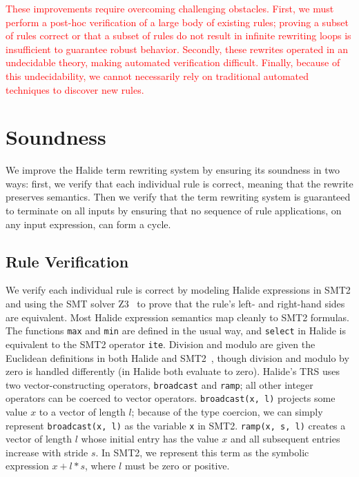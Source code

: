 \documentclass[acmsmall,review]{acmart}\settopmatter{printfolios=true,printccs=false,printacmref=false}
\newcommand{\sak}[1]{\textcolor{olive}{\textit{[{#1} --SK]}}}
\newcommand{\modified}[1]{\textcolor{red}{{#1}}}
\begin{document}
\modified{These improvements require overcoming challenging obstacles.  First,
  we must perform a post-hoc verification of a large body of existing rules;
  proving a subset of rules correct or that a subset of rules do not result in infinite
  rewriting loops is insufficient to guarantee robust behavior.  Secondly,
  these rewrites operated in an undecidable theory, making automated verification
  difficult.  Finally, because of this undecidability, we cannot necessarily
  rely on traditional automated techniques to discover new rules.}

\section{Soundness}
\label{sec:soundness}

We improve the Halide term rewriting system by ensuring its soundness in
two ways: first, we verify that each individual rule is correct, meaning that the
rewrite preserves semantics. Then we verify that the term rewriting system is
guaranteed to terminate on all inputs by ensuring that no sequence of
rule applications, on any input expression, can form a cycle.

\subsection{Rule Verification}
\label{sec:verification}
We verify each individual rule is correct by modeling Halide
expressions in SMT2 and using the SMT solver Z3~\cite{de2008z3} to
prove that the rule's left- and right-hand sides are equivalent. Most Halide expression
semantics map cleanly to SMT2 formulas. The functions \texttt{max} and
\texttt{min} are defined in the usual way, and \texttt{select} in
Halide is equivalent to the SMT2 operator \texttt{ite}. Division and
modulo are given the Euclidean definitions in both Halide and
SMT2~\cite{boute1992euclidean}, though division and modulo by zero is handled
differently (in Halide both evaluate to zero).
Halide's TRS uses two vector-constructing operators, \texttt{broadcast} and \texttt{ramp}; all
other integer operators can be coerced to vector operators. 
\texttt{broadcast(x, l)} projects some value $x$ to a vector of length $l$; because of
the type coercion, we can simply represent \texttt{broadcast(x, l)} as the variable
\texttt{x} in SMT2. \texttt{ramp(x, s, l)} creates a vector of length $l$
whose initial entry has the value $x$ and all subsequent entries increase with
stride $s$. In SMT2, we represent this term as the symbolic expression $x + l *
s$, where $l$ must be zero or positive.
\end{document}
